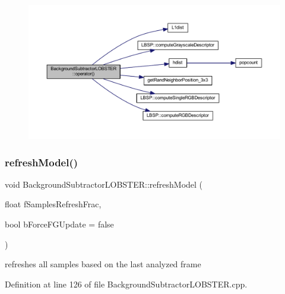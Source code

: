 \begin{figure}[H]
\begin{center}
\leavevmode
\includegraphics[width=350pt]{class_background_subtractor_l_o_b_s_t_e_r_a0c0faf2754a7a74a6ae56cea47207070_cgraph}
\end{center}
\end{figure}
\mbox{\label{class_background_subtractor_l_o_b_s_t_e_r_aeb3b23c1f47cfe71a73f3ca47ec06a75}} 
\subsubsection{\texorpdfstring{refresh\+Model()}{refreshModel()}}
{\footnotesize\ttfamily void Background\+Subtractor\+L\+O\+B\+S\+T\+E\+R\+::refresh\+Model (\begin{DoxyParamCaption}\item[{float}]{f\+Samples\+Refresh\+Frac,  }\item[{bool}]{b\+Force\+F\+G\+Update = {\ttfamily false} }\end{DoxyParamCaption})\hspace{0.3cm}{\ttfamily [virtual]}}



refreshes all samples based on the last analyzed frame 



Definition at line 126 of file Background\+Subtractor\+L\+O\+B\+S\+T\+E\+R.\+cpp.


